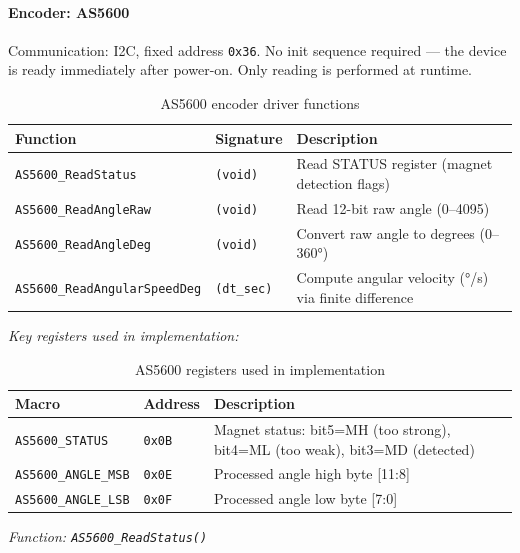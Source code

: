 \documentclass[12pt,a4paper]{article}
\begin{document}
\medskip

\paragraph{Encoder: AS5600}

Communication: I2C, fixed address \texttt{0x36}. No init sequence required —
the device is ready immediately after power-on. Only reading is performed at runtime.

\begin{table}[H]
\centering
\begin{tabular}{lll}
\hline
\textbf{Function} & \textbf{Signature} & \textbf{Description} \\
\hline
\texttt{AS5600\_ReadStatus}        & \texttt{(void)}        & Read STATUS register (magnet detection flags) \\
\texttt{AS5600\_ReadAngleRaw}      & \texttt{(void)}        & Read 12-bit raw angle (0--4095) \\
\texttt{AS5600\_ReadAngleDeg}      & \texttt{(void)}        & Convert raw angle to degrees (0--360°) \\
\texttt{AS5600\_ReadAngularSpeedDeg} & \texttt{(dt\_sec)}   & Compute angular velocity (°/s) via finite difference \\
\hline
\end{tabular}
\caption{AS5600 encoder driver functions}
\end{table}

\medskip
\textit{Key registers used in implementation:}

\begin{table}[H]
\centering
\begin{tabular}{lll}
\hline
\textbf{Macro} & \textbf{Address} & \textbf{Description} \\
\hline
\texttt{AS5600\_STATUS}    & \texttt{0x0B} & Magnet status: bit5=MH (too strong), bit4=ML (too weak), bit3=MD (detected) \\
\texttt{AS5600\_ANGLE\_MSB}& \texttt{0x0E} & Processed angle high byte [11:8] \\
\texttt{AS5600\_ANGLE\_LSB}& \texttt{0x0F} & Processed angle low byte [7:0] \\
\hline
\end{tabular}
\caption{AS5600 registers used in implementation}
\end{table}

\textit{Function: \texttt{AS5600\_ReadStatus()}}
\end{document}
